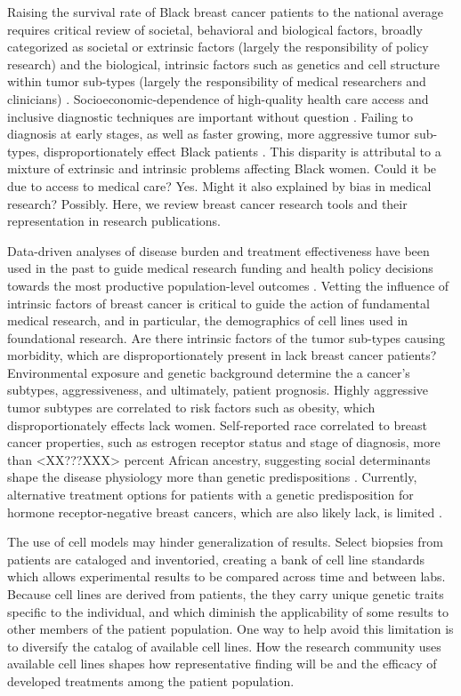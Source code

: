 \documentclass[11pt]{article}
\begin{document}
Raising the survival rate of Black breast cancer patients to the national average requires  critical review of societal, behavioral and biological factors, broadly categorized as societal or extrinsic factors (largely the responsibility of policy research) and the biological, intrinsic factors such as genetics and cell structure within tumor sub-types (largely the responsibility of medical researchers and clinicians) \cite{reding2012examination, brennan2012there}. Socioeconomic-dependence of high-quality health care access and inclusive diagnostic techniques are important without question \cite{shavers2003racial}. Failing to diagnosis at early stages, as well as faster growing, more aggressive tumor sub-types, disproportionately effect Black patients \cite{batina2013variation}. This disparity is attributal to a mixture of extrinsic and intrinsic problems affecting Black women. Could it be due to access to medical care? Yes. Might it also explained by bias in medical research? Possibly. Here, we review breast cancer research tools and their representation in research publications.

Data-driven analyses of disease burden and treatment effectiveness have been used in the past to guide medical research funding and health policy decisions towards the most productive population-level outcomes \cite{kim2016cancer}. Vetting the influence of intrinsic factors of breast cancer is critical to guide the action of fundamental medical research, and in particular, the demographics of cell lines used in foundational research. Are there intrinsic factors of the tumor sub-types causing morbidity, which are disproportionately present in  lack breast cancer patients? Environmental exposure and genetic background determine the a cancer's subtypes, aggressiveness, and ultimately, patient prognosis. Highly aggressive tumor subtypes are correlated to risk factors such as obesity, which disproportionately effects lack women. Self-reported race correlated to breast cancer properties, such as estrogen receptor status and stage of diagnosis, more than <XX???XXX> percent African ancestry, suggesting social determinants shape the disease physiology more than genetic predispositions \cite{reding2012examination}. Currently, alternative treatment options for patients with a genetic predisposition for hormone receptor-negative breast cancers, which are also likely lack, is limited \cite{huo2009population}.

The use of cell models may hinder generalization of results. Select biopsies from patients are cataloged and inventoried, creating a bank of cell line standards which allows experimental results to be compared across time and between labs. Because cell lines are derived from patients, the they carry unique genetic traits specific to the individual, and which diminish the applicability of some results to other members of the patient population. One way to help avoid this limitation is to diversify the catalog of available cell lines. How the research community uses available cell lines shapes how representative finding will be and the efficacy of developed treatments among the patient population.  
\end{document}
